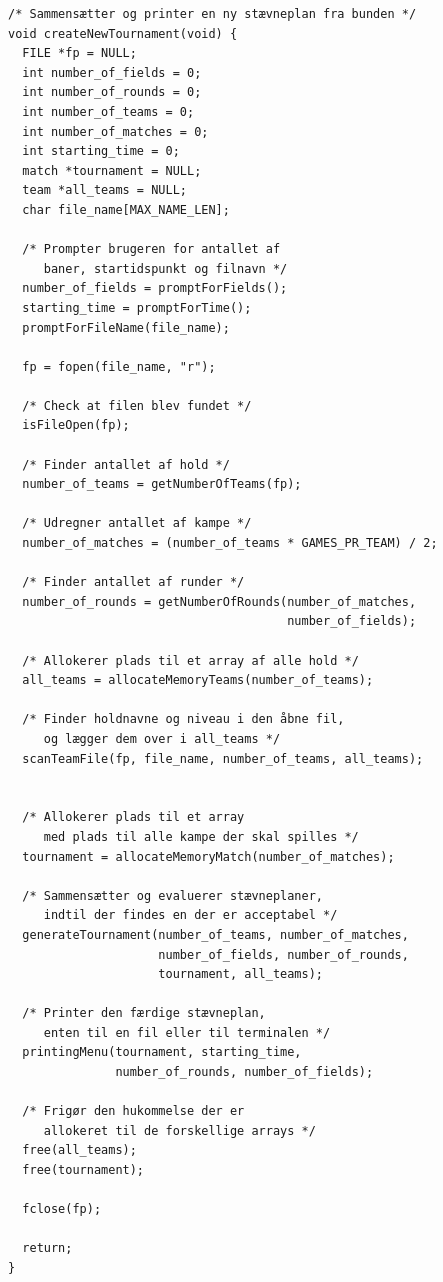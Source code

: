 \begin{source}
\begin{verbatim}
/* Sammensætter og printer en ny stævneplan fra bunden */
void createNewTournament(void) {
  FILE *fp = NULL;
  int number_of_fields = 0;
  int number_of_rounds = 0;
  int number_of_teams = 0;
  int number_of_matches = 0;
  int starting_time = 0;
  match *tournament = NULL;
  team *all_teams = NULL;
  char file_name[MAX_NAME_LEN];

  /* Prompter brugeren for antallet af 
     baner, startidspunkt og filnavn */
  number_of_fields = promptForFields();
  starting_time = promptForTime();
  promptForFileName(file_name);

  fp = fopen(file_name, "r");

  /* Check at filen blev fundet */
  isFileOpen(fp);

  /* Finder antallet af hold */
  number_of_teams = getNumberOfTeams(fp);

  /* Udregner antallet af kampe */
  number_of_matches = (number_of_teams * GAMES_PR_TEAM) / 2;

  /* Finder antallet af runder */
  number_of_rounds = getNumberOfRounds(number_of_matches, 
                                       number_of_fields);
                                       
  /* Allokerer plads til et array af alle hold */
  all_teams = allocateMemoryTeams(number_of_teams);

  /* Finder holdnavne og niveau i den åbne fil,
     og lægger dem over i all_teams */
  scanTeamFile(fp, file_name, number_of_teams, all_teams);


  /* Allokerer plads til et array 
     med plads til alle kampe der skal spilles */
  tournament = allocateMemoryMatch(number_of_matches);

  /* Sammensætter og evaluerer stævneplaner, 
     indtil der findes en der er acceptabel */
  generateTournament(number_of_teams, number_of_matches, 
                     number_of_fields, number_of_rounds, 
                     tournament, all_teams);

  /* Printer den færdige stævneplan, 
     enten til en fil eller til terminalen */
  printingMenu(tournament, starting_time, 
               number_of_rounds, number_of_fields);

  /* Frigør den hukommelse der er 
     allokeret til de forskellige arrays */
  free(all_teams);
  free(tournament);

  fclose(fp);

  return;
}
\end{verbatim}
\label{code:createNewTournament}
\end{source}
